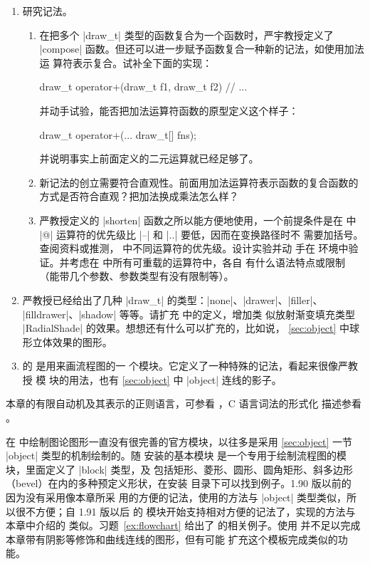\begin{enumerate}
  \item 研究记法。
    \begin{enumerate}
      \item 在把多个 |draw_t| 类型的函数复合为一个函数时，严宇教授定义了
        |compose| 函数。但还可以进一步赋予函数复合一种新的记法，如使用加法运
        算符表示复合。试补全下面的实现：
\begin{asycode}
draw_t operator+(draw_t f1, draw_t f2)
{
    // ...
}
\end{asycode}
        并动手试验，能否把加法运算符函数的原型定义这个样子：
\begingroup
\renewcommand\thelstnumber{?}
\begin{asycode}[numbers=left]
draw_t operator+(... draw_t[] fns);
\end{asycode}
\endgroup
        并说明事实上前面定义的二元运算就已经足够了。

      \item 新记法的创立需要符合直观性。前面用加法运算符表示函数的复合函数的
        方式是否符合直观？把加法换成乘法怎么样？

      \item 严教授定义的 |shorten| 函数之所以能方便地使用，一个前提条件是在
        \Asy{} 中 |@| 运算符的优先级比 |--| 和 |..| 要低，因而在变换路径时不
        需要加括号。查阅资料或推测，\Asy{} 中不同运算符的优先级。设计实验并动
        手在 \Asy{} 环境中验证。并考虑在 \Asy{} 中所有可重载的运算符中，各自
        有什么语法特点或限制（能带几个参数、参数类型有没有限制等）。
    \end{enumerate}%

  \item 严教授已经给出了几种 |draw_t| 的类型：|none|、|drawer|、|filler|、
    |filldrawer|、|shadow| 等等。请扩充  中的定义，增加类
    似放射渐变填充类型 |RadialShade| 的效果。想想还有什么可以扩充的，比如说，
    \autoref{sec:object} 中球形立体效果的图形。

  \item\label{ex:flowchart} \Asy{} 的  是用来画流程图的一
    个模块。它定义了一种特殊的记法，看起来很像严教授  模
    块的用法，也有 \autoref{sec:object} 中 |object| 连线的影子。

\end{enumerate}

本章的有限自动机及其表示的正则语言，可参看 \cite{aho1974}，C 语言词法的形式化
描述参看 \cite{harbison2002}。

在 \Asy{} 中绘制图论图形一直没有很完善的官方模块，以往多是采用
\autoref{sec:object} 一节 |object| 类型的机制绘制的。随 \Asy{} 安装的基本模块
 是一个专用于绘制流程图的模块，里面定义了 |block| 类型，及
包括矩形、菱形、圆形、圆角矩形、斜多边形（bevel）在内的多种预定义形状，在安装
目录下可以找到例子。1.90 版以前的  因为没有采用像本章所采
用的方便的记法，使用的方法与 |object| 类型类似，所以很不方便；自 1.91 版以后
的  模块开始支持相对方便的记法了，实现的方法与本章中介绍的
类似。习题~\ref{ex:flowchart} 给出了  的相关例子。使用
 并不足以完成本章带有阴影等修饰和曲线连线的图形，但有可能
扩充这个模板完成类似的功能。

